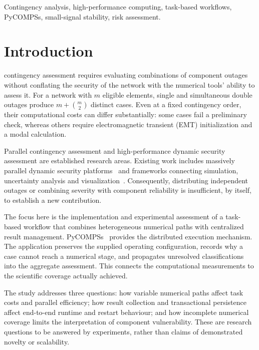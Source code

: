 \documentclass[journal]{IEEEtran}
\begin{document}
\begin{IEEEkeywords}
Contingency analysis, high-performance computing, task-based workflows, PyCOMPSs, small-signal stability, risk assessment.
\end{IEEEkeywords}

\section{Introduction}
 contingency assessment requires evaluating combinations of component outages without conflating the security of the network with the numerical tools' ability to assess it. For a network with $m$ eligible elements, single and simultaneous double outages produce $m+\binom{m}{2}$ distinct cases. Even at a fixed contingency order, their computational costs can differ substantially: some cases fail a preliminary check, whereas others require electromagnetic transient (EMT) initialization and a modal calculation.

Parallel contingency assessment and high-performance dynamic security assessment are established research areas. Existing work includes massively parallel dynamic security platforms~\cite{konstantelos2017} and frameworks connecting simulation, uncertainty analysis and visualization~\cite{chen2018framework}. Consequently, distributing independent outages or combining severity with component reliability is insufficient, by itself, to establish a new contribution.

The focus here is the implementation and experimental assessment of a task-based workflow that combines heterogeneous numerical paths with centralized result management. PyCOMPSs~\cite{pycompss_softx,pycompss_tejedor2017} provides the distributed execution mechanism. The application preserves the supplied operating configuration, records why a case cannot reach a numerical stage, and propagates unresolved classifications into the aggregate assessment. This connects the computational measurements to the scientific coverage actually achieved.

The study addresses three questions: how variable numerical paths affect task costs and parallel efficiency; how result collection and transactional persistence affect end-to-end runtime and restart behaviour; and how incomplete numerical coverage limits the interpretation of component vulnerability. These are research questions to be answered by experiments, rather than claims of demonstrated novelty or scalability.
\end{document}
